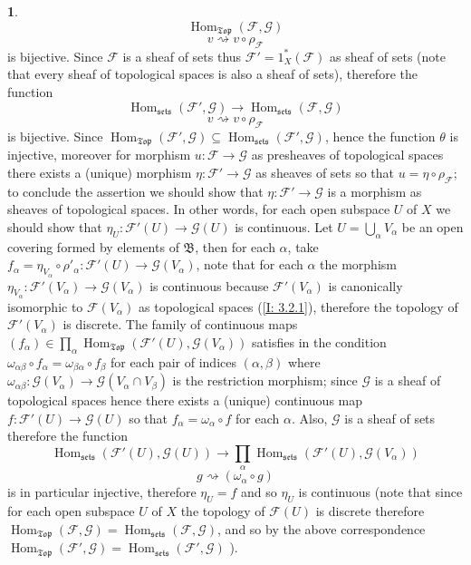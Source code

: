 \documentclass[12pt]{amsart}
\newcommand{\Hom}{\operatorname{Hom}}
\newcommand{\sets}{\operatorname{\mathfrak{sets}}}
\newcommand{\Top}{\operatorname{\mathfrak{Top}}}
\theoremstyle{definition}
\newtheorem{bk}[proposition]{}
\begin{document}
\begin{bk}
$$\Hom_{\Top}(\mathscr{F},\mathscr{G})$$ $$v\rightsquigarrow v\circ\rho_{\mathcal{F}}$$ is bijective. Since $\mathscr{F}$ is a sheaf of sets thus $\mathscr{F}'=1_{X}^{\ast}(\mathscr{F})$ as sheaf of sets (note that every sheaf of topological spaces is also a sheaf of sets), therefore
the function $$\Hom_{\sets}(\mathscr{F}',\mathscr{G})\rightarrow
\Hom_{\sets}(\mathscr{F},\mathscr{G})$$ $$v\rightsquigarrow v\circ\rho_{\mathcal{F}}$$ is bijective. Since $\Hom_{\Top}(\mathscr{F}',\mathscr{G})\subseteq
\Hom_{\sets}(\mathscr{F}',\mathscr{G})$, hence the function $\theta$ is injective, moreover for morphism $u:\mathscr{F}\rightarrow\mathscr{G}$ as presheaves of topological spaces there exists a (unique) morphism $\eta:\mathscr{F}'\rightarrow\mathscr{G}$ as sheaves of sets so that $u=\eta\circ\rho_{\mathcal{F}}$; to conclude the assertion we should show that $\eta:\mathscr{F}'\rightarrow\mathscr{G}$ is a morphism as sheaves of topological spaces. In other words, for each open subspace $U$ of $X$ we should show that $\eta_{U}:\mathscr{F}'(U)\rightarrow\mathscr{G}(U)$ is continuous. Let $U=\bigcup\limits_{\alpha}V_{\alpha}$ be an open covering formed by elements of $\mathfrak{B}$, then for each $\alpha$, take $f_{\alpha}=\eta_{V_{\alpha}}\circ\rho'_{\alpha}:
\mathscr{F}'(U)\rightarrow\mathscr{G}(V_{\alpha})$, note that for each $\alpha$ the morphism $\eta_{V_{\alpha}}:\mathscr{F}'(V_{\alpha})
\rightarrow\mathscr{G}(V_{\alpha})$ is continuous because $\mathscr{F}'(V_{\alpha})$ is canonically isomorphic to $\mathscr{F}(V_{\alpha})$ as topological spaces (\ref{I: 3.2.1}), therefore
the topology of
$\mathscr{F}'(V_{\alpha})$ is discrete. The family of continuous maps $(f_{\alpha})\in\prod\limits_{\alpha}
\Hom_{\Top}(\mathscr{F}'(U),\mathscr{G}(V_{\alpha}))$ satisfies in the condition $\omega_{\alpha\beta}\circ f_{\alpha}=\omega_{\beta\alpha}\circ f_{\beta}$ for each pair of indices $(\alpha,\beta)$ where $\omega_{\alpha\beta}:
\mathscr{G}(V_{\alpha})\rightarrow
\mathscr{G}(V_{\alpha}\cap V_{\beta})$ is the restriction morphism; since $\mathscr{G}$ is a sheaf of topological spaces hence there exists a (unique) continuous map $f:\mathscr{F}'(U)\rightarrow\mathscr{G}(U)$ so that $f_{\alpha}=\omega_{\alpha}\circ f$ for each $\alpha$. Also, $\mathscr{G}$ is a sheaf of sets therefore the function $$\Hom_{\sets}(\mathscr{F}'(U),\mathscr{G}(U))\rightarrow
\prod\limits_{\alpha}
\Hom_{\sets}(\mathscr{F}'(U),\mathscr{G}(V_{\alpha}))$$  $$g\rightsquigarrow(\omega_{\alpha}\circ g)$$ is in particular injective, therefore $\eta_{U}=f$ and so $\eta_{U}$ is continuous (note that since for each open subspace $U$ of $X$ the topology of $\mathscr{F}(U)$ is discrete therefore $\Hom_{\Top}(\mathscr{F},\mathscr{G})=
\Hom_{\sets}(\mathscr{F},\mathscr{G})$, and so by the above correspondence  $\Hom_{\Top}(\mathscr{F}',\mathscr{G})=
\Hom_{\sets}(\mathscr{F}',\mathscr{G})$ ).


\end{bk}
\end{document}
